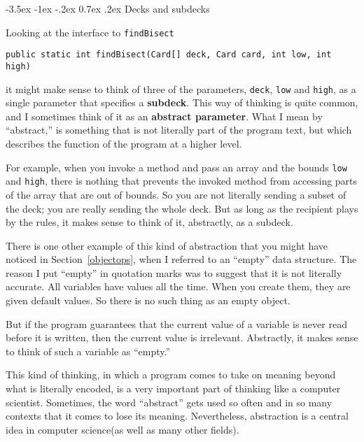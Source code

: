 \documentclass{book}
\makeatletter
\renewcommand{\section}{\@startsection 
    {section} {1} {0mm}%
    {-3.5ex \@plus -1ex \@minus -.2ex}%
    {0.7ex \@plus.2ex}%
    {\normalfont\Large\bfseries}}
\makeatother
\begin{document}


\section{Decks and subdecks}

Looking at the interface to {\tt findBisect}

\begin{verbatim}
public static int findBisect(Card[] deck, Card card, int low, int high)
\end{verbatim}


it might make sense to think of three of the parameters, {\tt deck},
{\tt low} and {\tt high}, as a single parameter that specifies a {\bf
subdeck}.  This way of thinking is quite common, and I sometimes think
of it as an {\bf abstract parameter}.  What I mean by ``abstract,'' is
something that is not literally part of the program text, but which
describes the function of the program at a higher level.

For example, when you invoke a method and pass an array and the bounds
{\tt low} and {\tt high}, there is nothing that prevents the invoked
method from accessing parts of the array that are out of bounds.  So
you are not literally sending a subset of the deck; you are really
sending the whole deck.  But as long as the recipient plays by the
rules, it makes sense to think of it, abstractly, as a subdeck.

There is one other example of this kind of abstraction that you might
have noticed in Section~\ref{objectops}, when I referred to an
``empty'' data structure.  The reason I put ``empty'' in quotation
marks was to suggest that it is not literally accurate.  All variables
have values all the time.  When you create them, they are given
default values.  So there is no such thing as an empty object.

But if the program guarantees that the current value of a variable is
never read before it is written, then the current value is irrelevant.
Abstractly, it makes sense to think of such a variable as ``empty.''

This kind of thinking, in which a program comes to take on meaning
beyond what is literally encoded, is a very important part of thinking
like a computer scientist.  Sometimes, the word ``abstract'' gets used
so often and in so many contexts that it comes to lose its meaning.
Nevertheless, abstraction is a central idea in computer science(as
well as many other fields).
\end{document}
